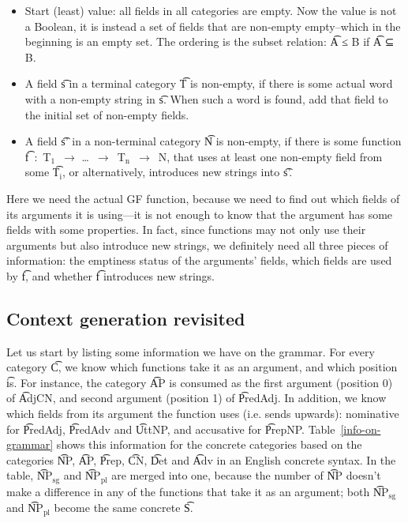 \begin{itemize}
\item Start (least) value: all fields in all categories are empty. Now
  the value is not a Boolean, it is instead a set of fields that are
  non-empty empty–which in the beginning is an empty set. The ordering
  is the subset relation: \t{A ≤ B} if \t{A ⊆ B}.
\item A field \t{s} in a terminal category \t{T} is non-empty, if
  there is some actual word with a non-empty string in \t{s}. When
  such a word is found, add that field to the initial set of non-empty
  fields.
\item A field \t{s'} in a non-terminal category \t{N} is non-empty, if
  there is some function \t{f~:~T$_\text{1}$~$\rightarrow$
    \dots~$\rightarrow$~T$_\text{n}$~$\rightarrow$~N}, that uses at
  least one non-empty field from some \t{T$_\text{i}$}, or
  alternatively, introduces new strings into \t{s'}.
\end{itemize}

Here we need the actual GF function, because we need to find out which
fields of its arguments it is using---it is not enough to know that
the argument has some fields with some properties. In fact, since
functions may not only use their arguments but also introduce new
strings, we definitely need all three pieces of information: the
emptiness status of the arguments’ fields, which fields are used by
\t{f}, and whether \t{f} introduces new strings.

\subsection{Context generation revisited}

Let us start by listing some information we have on the grammar.  For
every category \t{C}, we know which functions take it as an argument, and
which position \t is. For instance, the category \t{AP} is consumed as
the first argument (position 0) of \t{AdjCN}, and second argument
(position 1) of \t{PredAdj}.  In addition, we know which fields from
its argument the function uses (i.e. sends upwards): nominative for
\t{PredAdj}, \t{PredAdv} and \t{UttNP}, and accusative for \t{PrepNP}.
Table~\ref{info-on-grammar} shows this information for the concrete
categories based on the \gf{} categories \t{NP}, \t{AP}, \t{Prep},
\t{CN}, \t{Det} and \t{Adv} in an English concrete syntax.
In the table, \t{NP$_{\text{sg}}$} and \t{NP$_{\text{pl}}$} are merged
into one, because the number of \t{NP} doesn't make a difference in
any of the functions that take it as an argument; both
\t{NP$_{\text{sg}}$} and \t{NP$_{\text{pl}}$} become the same concrete \t{S}.


